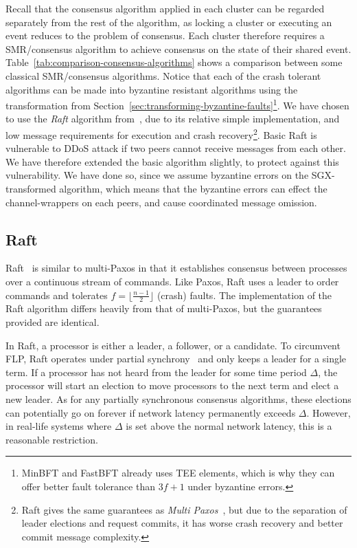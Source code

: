 \documentclass{article}
\begin{document}
    Recall that the consensus algorithm applied in each cluster can be regarded separately from the rest of the algorithm, as locking a cluster or executing an event reduces to the problem of consensus.
	Each cluster therefore requires a SMR/consensus algorithm to achieve consensus on the state of their shared event.
	Table~\ref{tab:comparison-consensus-algorithms} shows a comparison between some classical SMR/consensus algorithms.
	Notice that each of the crash tolerant algorithms can be made into byzantine resistant algorithms using the transformation from Section~\ref{sec:transforming-byzantine-faults}\footnote{MinBFT and FastBFT already uses TEE elements, which is why they can offer better fault tolerance than $3f+1$ under byzantine errors.}.
	We have chosen to use the \textit{Raft} algorithm from~\cite{ongaro_search_2014}, due to its relative simple implementation, and low message requirements for execution and crash recovery\footnote{Raft gives the same guarantees as \textit{Multi Paxos}~\cite{lamport_part-time_1998}, but due to the separation of leader elections and request commits, it has worse crash recovery and better commit message complexity.}.
	Basic Raft is vulnerable to DDoS attack if two peers cannot receive messages from each other.
	We have therefore extended the basic algorithm slightly, to protect against this vulnerability.
	We have done so, since we assume byzantine errors on the SGX-transformed algorithm, which means that the byzantine errors can effect the channel-wrappers on each peers, and cause coordinated message omission.

	\subsection{Raft}
	\label{sub:raft}

	Raft~\cite{ongaro_search_2014} is similar to multi-Paxos in that it establishes consensus between processes over a continuous stream of commands.
	Like Paxos, Raft uses a leader to order commands and tolerates $f = \lfloor \frac{n - 1}{2} \rfloor$ (crash) faults.
	The implementation of the Raft algorithm differs heavily from that of multi-Paxos, but the guarantees provided are identical.

	In Raft, a processor is either a leader, a follower, or a candidate.
	To circumvent FLP, Raft operates under partial synchrony~\cite{dwork_consensus_1988} and only keeps a leader for a single term.
	If a processor has not heard from the leader for some time period $\Delta$, the processor will start an election to move processors to the next term and elect a new leader.
	As for any partially synchronous consensus algorithms, these elections can potentially go on forever if network latency permanently exceeds $\Delta$.
	However, in real-life systems where $\Delta$ is set above the normal network latency, this is a reasonable restriction.
\end{document}
